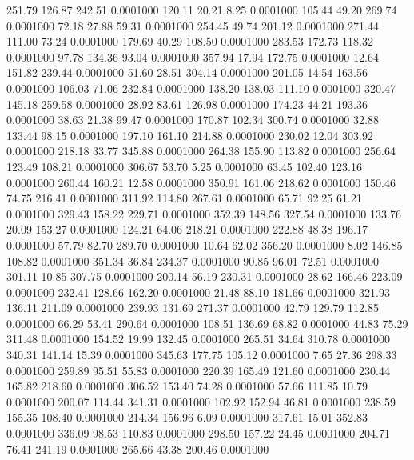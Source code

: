  251.79  126.87  242.51   0.0001000
 120.11   20.21    8.25   0.0001000
 105.44   49.20  269.74   0.0001000
  72.18   27.88   59.31   0.0001000
 254.45   49.74  201.12   0.0001000
 271.44  111.00   73.24   0.0001000
 179.69   40.29  108.50   0.0001000
 283.53  172.73  118.32   0.0001000
  97.78  134.36   93.04   0.0001000
 357.94   17.94  172.75   0.0001000
  12.64  151.82  239.44   0.0001000
  51.60   28.51  304.14   0.0001000
 201.05   14.54  163.56   0.0001000
 106.03   71.06  232.84   0.0001000
 138.20  138.03  111.10   0.0001000
 320.47  145.18  259.58   0.0001000
  28.92   83.61  126.98   0.0001000
 174.23   44.21  193.36   0.0001000
  38.63   21.38   99.47   0.0001000
 170.87  102.34  300.74   0.0001000
  32.88  133.44   98.15   0.0001000
 197.10  161.10  214.88   0.0001000
 230.02   12.04  303.92   0.0001000
 218.18   33.77  345.88   0.0001000
 264.38  155.90  113.82   0.0001000
 256.64  123.49  108.21   0.0001000
 306.67   53.70    5.25   0.0001000
  63.45  102.40  123.16   0.0001000
 260.44  160.21   12.58   0.0001000
 350.91  161.06  218.62   0.0001000
 150.46   74.75  216.41   0.0001000
 311.92  114.80  267.61   0.0001000
  65.71   92.25   61.21   0.0001000
 329.43  158.22  229.71   0.0001000
 352.39  148.56  327.54   0.0001000
 133.76   20.09  153.27   0.0001000
 124.21   64.06  218.21   0.0001000
 222.88   48.38  196.17   0.0001000
  57.79   82.70  289.70   0.0001000
  10.64   62.02  356.20   0.0001000
   8.02  146.85  108.82   0.0001000
 351.34   36.84  234.37   0.0001000
  90.85   96.01   72.51   0.0001000
 301.11   10.85  307.75   0.0001000
 200.14   56.19  230.31   0.0001000
  28.62  166.46  223.09   0.0001000
 232.41  128.66  162.20   0.0001000
  21.48   88.10  181.66   0.0001000
 321.93  136.11  211.09   0.0001000
 239.93  131.69  271.37   0.0001000
  42.79  129.79  112.85   0.0001000
  66.29   53.41  290.64   0.0001000
 108.51  136.69   68.82   0.0001000
  44.83   75.29  311.48   0.0001000
 154.52   19.99  132.45   0.0001000
 265.51   34.64  310.78   0.0001000
 340.31  141.14   15.39   0.0001000
 345.63  177.75  105.12   0.0001000
   7.65   27.36  298.33   0.0001000
 259.89   95.51   55.83   0.0001000
 220.39  165.49  121.60   0.0001000
 230.44  165.82  218.60   0.0001000
 306.52  153.40   74.28   0.0001000
  57.66  111.85   10.79   0.0001000
 200.07  114.44  341.31   0.0001000
 102.92  152.94   46.81   0.0001000
 238.59  155.35  108.40   0.0001000
 214.34  156.96    6.09   0.0001000
 317.61   15.01  352.83   0.0001000
 336.09   98.53  110.83   0.0001000
 298.50  157.22   24.45   0.0001000
 204.71   76.41  241.19   0.0001000
 265.66   43.38  200.46   0.0001000
